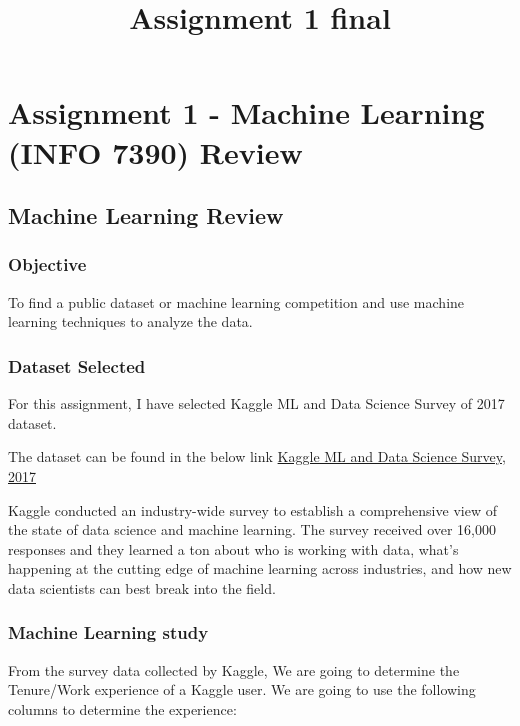 \documentclass[11pt]{article}
\title{Assignment 1 final}
\begin{document}
    
    
    \maketitle
    
    

    
    \section{Assignment 1 - Machine Learning (INFO 7390)
Review}\label{assignment-1---machine-learning-info-7390-review}

\subsection{Machine Learning Review}\label{machine-learning-review}

    \subsubsection{Objective}\label{objective}

    To find a public dataset or machine learning competition and use machine
learning techniques to analyze the data.

    \subsubsection{Dataset Selected}\label{dataset-selected}

    For this assignment, I have selected Kaggle ML and Data Science Survey
of 2017 dataset.

The dataset can be found in the below link
\href{https://www.kaggle.com/kaggle/kaggle-survey-2017}{Kaggle ML and
Data Science Survey, 2017}

Kaggle conducted an industry-wide survey to establish a comprehensive
view of the state of data science and machine learning. The survey
received over 16,000 responses and they learned a ton about who is
working with data, what's happening at the cutting edge of machine
learning across industries, and how new data scientists can best break
into the field.

    \subsubsection{Machine Learning study}\label{machine-learning-study}

    From the survey data collected by Kaggle, We are going to determine the
Tenure/Work experience of a Kaggle user. We are going to use the
following columns to determine the experience:
\end{document}
